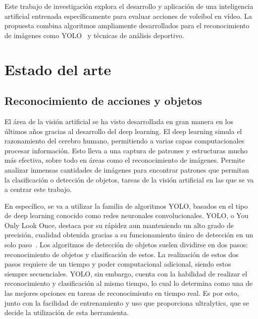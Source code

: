 \documentclass[12pt]{report} %
\begin{document}
    Este trabajo de investigación explora el desarrollo y aplicación de una
    inteligencia artificial entrenada específicamente para evaluar acciones de
    voleibol en vídeo. La propuesta combina algoritmos ampliamente
    desarrollados para el reconocimiento de imágenes como YOLO~\cite{YOLO} y
    técnicas de análisis deportivo.

 

    \chapter{Estado del arte}
    \label{chap:estadoarte}

    \section{Reconocimiento de acciones y objetos}
    El área de la visión artificial se ha visto desarrollada en gran manera en
    los últimos años gracias al desarrollo del deep learning. El deep learning
    simula el razonamiento del cerebro humano, permitiendo a varias capas
    computacionales procesar información. Esto lleva a una captura de patrones
    y estructuras mucho más efectiva, sobre todo en áreas como el
    reconocimiento de imágenes. Permite analizar inmensas cantidades de
    imágenes para encontrar patrones que permitan la clasificación o detección
    de objetos, tareas de la visión artificial en las que se va a centrar este
    trabajo. ~\cite{VOULODIMOS2018} 
    
    En específico, se va a utilizar la familia de algoritmos YOLO,
    basados en el tipo de deep learning conocido como redes neuronales
    convolucionales. YOLO, o You Only Look Once, destaca por su rápidez aun
    manteniendo un alto grado de precisión, cualidad obtenida gracias a su
    funcionamiento único de detección en un solo paso~\cite{JIANG20221066}. Los algoritmos de
    detección de objetos suelen dividirse en dos pasos: reconocimiento de
    objetos y clasificación de estos. La realización de estos dos pasos
    requiere de un tiempo y poder computacional adicional, siendo estos siempre
    secuenciales. YOLO, sin embargo, cuenta con la habilidad de realizar el
    reconocimiento y clasificación al mismo tiempo, lo cual lo determina como
    una de las mejores opciones en tareas de reconocimiento en tiempo real. Es
    por esto, junto con la facilidad de entrenamiento y uso que proporciona
    ultralytics, que se decide la utilización de esta herramienta.
\end{document}
